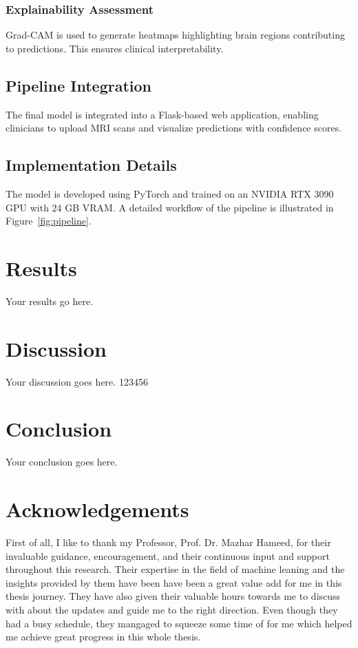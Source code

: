\documentclass[12pt,twocolumn]{report}
\begin{document}
\subsection{Explainability Assessment}
Grad-CAM is used to generate heatmaps highlighting brain regions contributing to predictions. This ensures clinical interpretability.

\section{Pipeline Integration}

The final model is integrated into a Flask-based web application, enabling clinicians to upload MRI scans and visualize predictions with confidence scores.

\section{Implementation Details}

The model is developed using PyTorch and trained on an NVIDIA RTX 3090 GPU with 24 GB VRAM. A detailed workflow of the pipeline is illustrated in Figure~\ref{fig:pipeline}.



\chapter{Results}
Your results go here.

\chapter{Discussion}
Your discussion goes here. 123456

\chapter{Conclusion}
Your conclusion goes here.

\chapter*{Acknowledgements}

First of all, I like to thank my Professor, Prof. Dr. Mazhar Hameed, for their invaluable guidance, encouragement, and their continuous input and support throughout this research. Their expertise in the field of machine leaning and the insights provided by them have been have been a great value add for me in this thesis journey. They have also given their valuable hours towards me to discuss with about the updates and guide me to the right direction. Even though they had a busy schedule, they mangaged to squeeze some time of for me which helped me achieve great progress in this whole thesis.
\end{document}
